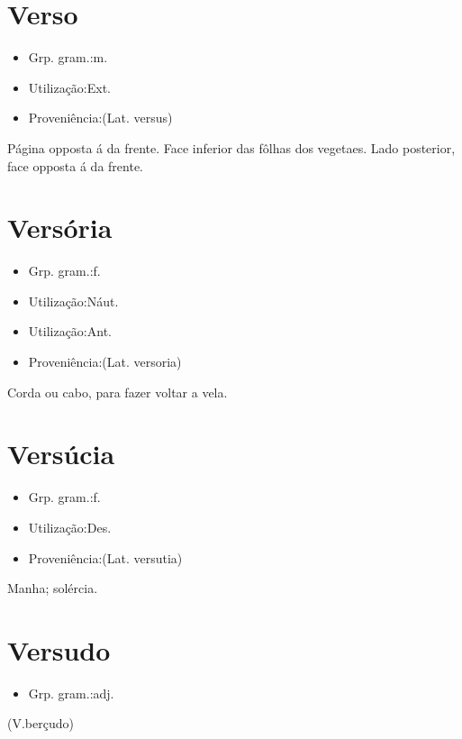 \documentclass{article}
\begin{document}
\section{Verso}
\begin{itemize}
\item {Grp. gram.:m.}
\end{itemize}
\begin{itemize}
\item {Utilização:Ext.}
\end{itemize}
\begin{itemize}
\item {Proveniência:(Lat. \textunderscore versus\textunderscore )}
\end{itemize}
Página opposta á da frente.
Face inferior das fôlhas dos vegetaes.
Lado posterior, face opposta á da frente.
\section{Versória}
\begin{itemize}
\item {Grp. gram.:f.}
\end{itemize}
\begin{itemize}
\item {Utilização:Náut.}
\end{itemize}
\begin{itemize}
\item {Utilização:Ant.}
\end{itemize}
\begin{itemize}
\item {Proveniência:(Lat. \textunderscore versoria\textunderscore )}
\end{itemize}
Corda ou cabo, para fazer voltar a vela.
\section{Versúcia}
\begin{itemize}
\item {Grp. gram.:f.}
\end{itemize}
\begin{itemize}
\item {Utilização:Des.}
\end{itemize}
\begin{itemize}
\item {Proveniência:(Lat. \textunderscore versutia\textunderscore )}
\end{itemize}
Manha; solércia.
\section{Versudo}
\begin{itemize}
\item {Grp. gram.:adj.}
\end{itemize}
(V.berçudo)
\end{document}
